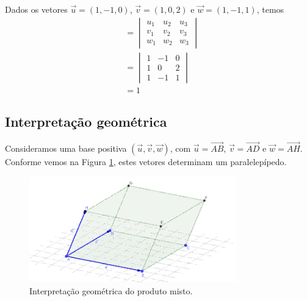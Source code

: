 \begin{ex}
  Dados os vetores $\vec{u} = (1,-1,0)$, $\vec{v} = (1,0,2)$ e $\vec{w} = (1,-1,1)$, temos
  \begin{align}
    [\vec{u},\vec{v},\vec{w}] &=
                                \begin{vmatrix}
                                  u_1 & u_2 & u_3 \\
                                  v_1 & v_2 & v_3 \\
                                  w_1 & w_2 & w_3       
                                \end{vmatrix} \\
                              &= \begin{vmatrix}
                                1 & -1 & 0 \\
                                1 & 0  & 2 \\
                                1 & -1 & 1       
                              \end{vmatrix} \\
                              &= 1
  \end{align}
\end{ex}

\subsection{Interpretação geométrica}\label{subsec:pm_ig}

Consideramos uma base positiva $(\vec{u},\vec{v},\vec{w})$, com $\vec{u}=\overrightarrow{AB}$, $\vec{v}=\overrightarrow{AD}$ e $\vec{w}=\overrightarrow{AH}$. Conforme vemos na Figura \ref{fig:pm_ig}, estes vetores determinam um paralelepípedo.

\begin{figure}[H]
  \centering
  \includegraphics[width=0.8\textwidth]{cap_prodmisto/dados/fig_pm_ig/fig_pm_ig}
  \caption{Interpretação geométrica do produto misto.}
  \label{fig:pm_ig}
\end{figure}

